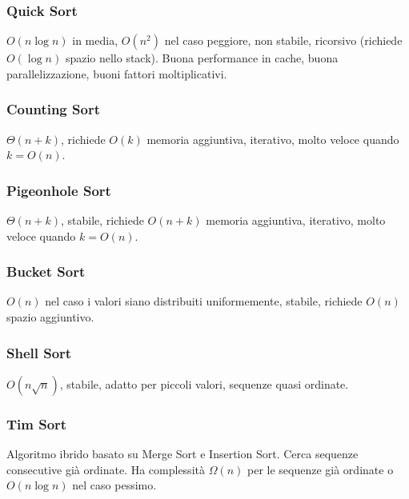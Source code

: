 \subsubsection{Quick Sort}
$O(n\log n)$ in media, $O(n^2)$ nel caso peggiore, non stabile, ricorsivo (richiede $O(\log n)$ spazio nello stack). Buona performance in cache, buona parallelizzazione, buoni fattori
moltiplicativi. 
\subsubsection{Counting Sort}
$\Theta(n+k)$, richiede $O(k)$ memoria aggiuntiva, iterativo, molto veloce quando $k= O(n)$.
\subsubsection{Pigeonhole Sort}
$\Theta(n + k)$, stabile, richiede $O(n+k)$ memoria aggiuntiva, iterativo, molto veloce quando $k = O(n)$.
\subsubsection{Bucket Sort}
$O(n)$ nel caso i valori siano distribuiti uniformemente, stabile, richiede $O(n)$ spazio aggiuntivo. 
\subsubsection{Shell Sort}
$O(n\sqrt{n})$, stabile, adatto per piccoli valori, sequenze quasi ordinate. 
\subsubsection{Tim Sort}
Algoritmo ibrido basato su Merge Sort e Insertion Sort. Cerca sequenze consecutive gi\`a ordinate. Ha complessit\`a $\Omega(n)$ per le sequenze gi\`a ordinate o $O(n\log n)$ nel caso
pessimo.
